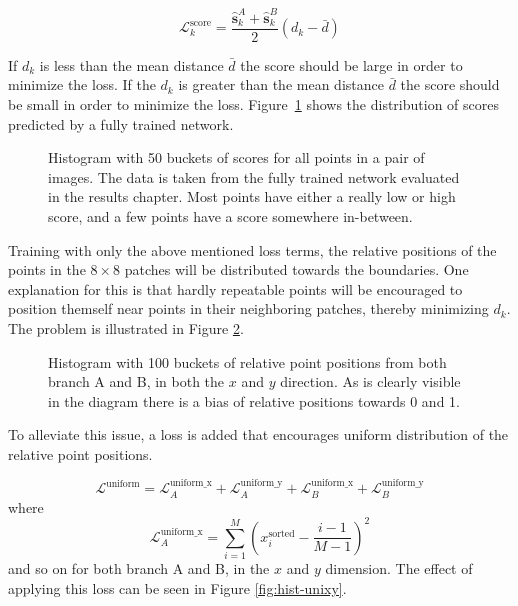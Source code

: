 \begin{equation}
\mathcal{L}_k^{\textrm{score}}=\frac{\hat{\textbf{s}}_k^A+\hat{\textbf{s}}_k^B}{2}\left(d_k-\bar{d}\right)
\end{equation}

If $d_k$ is less than the mean distance $\bar{d}$ the score should be large in order to minimize the loss. If the $d_k$ is greater than the mean distance $\bar{d}$ the score should be small in order to minimize the loss. Figure~\ref{fig:score-hist} shows the distribution of scores predicted by a fully trained network.

\begin{figure}[H]
	\begin{center}
		
	\end{center}
	\caption{Histogram with 50 buckets of scores for all points in a pair of images. The data is taken from the fully trained network evaluated in the results chapter. Most points have either a really low or high score, and a few points have a score somewhere in-between.}
	\label{fig:score-hist}
\end{figure}

Training with only the above mentioned loss terms, the relative positions of the points in the $8\times 8$ patches will be distributed towards the boundaries. One explanation for this is that hardly repeatable points will be encouraged to position themself near points in their neighboring patches, thereby minimizing $d_k$. The problem is illustrated in Figure \ref{fig:hist-no-unixy}.

\begin{figure}[H]
	\begin{center}
		
	\end{center}
	\caption{Histogram with 100 buckets of relative point positions from both branch A and B, in both the $x$ and $y$ direction. As is clearly visible in the diagram there is a bias of relative positions towards 0 and 1.}
	\label{fig:hist-no-unixy}
\end{figure}

To alleviate this issue, a loss is added that encourages uniform distribution of the relative point positions.


\begin{equation}
\mathcal{L}^{\textrm{uniform}}=\mathcal{L}^{\textrm{uniform\_x}}_A+\mathcal{L}^{\textrm{uniform\_y}}_A+\mathcal{L}^{\textrm{uniform\_x}}_B+\mathcal{L}^{\textrm{uniform\_y}}_B
\end{equation}
where
\begin{equation}
\mathcal{L}^{\textrm{uniform\_x}}_A=\sum_{i=1}^M\left(x_i^{\textrm{sorted}}-\frac{i-1}{M-1}\right)^2
\end{equation}
and so on for both branch A and B, in the $x$ and $y$ dimension. The effect of applying this loss can be seen in Figure \ref{fig:hist-unixy}.

